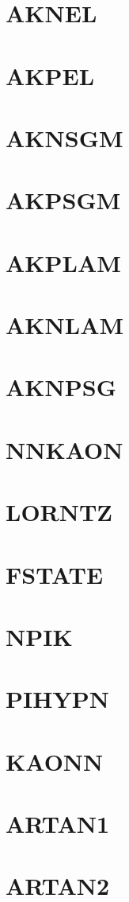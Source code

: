 \documentclass[14pt,UTF8]{ctexbook}
\begin{document}
\section{AKNEL}
\section{AKPEL}
\section{AKNSGM}
\section{AKPSGM}
\section{AKPLAM}
\section{AKNLAM}
\section{AKNPSG}
\section{NNKAON}
\section{LORNTZ}
\section{FSTATE}
\section{NPIK}
\section{PIHYPN}
\section{KAONN}
\section{ARTAN1}
\section{ARTAN2}
\end{document}
